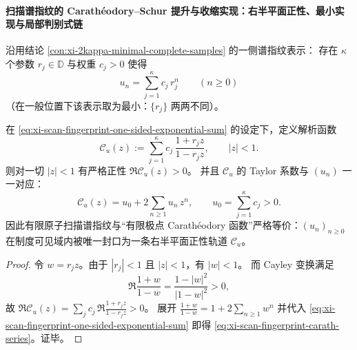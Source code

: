 \paragraph{扫描谱指纹的 Carath\'eodory--Schur 提升与收缩实现：右半平面正性、最小实现与局部判别式链}
沿用结论 \ref{con:xi-2kappa-minimal-complete-samples} 的一侧谱指纹表示：
存在 \(\kappa\) 个参数 \(r_j\in\mathbb{D}\) 与权重 \(c_j>0\) 使得
\begin{equation}\label{eq:xi-scan-fingerprint-one-sided-exponential-sum}
\boxed{\;
u_n=\sum_{j=1}^{\kappa}c_j\,r_j^n\qquad(n\ge 0)\;}
\end{equation}
（在一般位置下该表示取为最小：\(\{r_j\}\) 两两不同）。

\begin{proposition}\label{prop:xi-scan-fingerprint-caratheodory-lift}
在 \eqref{eq:xi-scan-fingerprint-one-sided-exponential-sum} 的设定下，定义解析函数
\begin{equation}\label{eq:xi-scan-fingerprint-carath}
\mathscr{C}_u(z):=\sum_{j=1}^{\kappa}c_j\,\frac{1+r_j z}{1-r_j z},
\qquad |z|<1.
\end{equation}
则对一切 \(|z|<1\) 有严格正性 \(\Re \mathscr{C}_u(z)>0\)。
并且 \(\mathscr{C}_u\) 的 Taylor 系数与 \((u_n)\) 一一对应：
\begin{equation}\label{eq:xi-scan-fingerprint-carath-series}
\boxed{\;
\mathscr{C}_u(z)
=u_0+2\sum_{n\ge 1}u_n\,z^n,\qquad u_0=\sum_{j=1}^{\kappa}c_j>0.\;}
\end{equation}
因此有限原子扫描谱指纹与“有限极点 Carath\'eodory 函数”严格等价：\((u_n)_{n\ge 0}\) 在制度可见域内被唯一封口为一条右半平面正性轨道 \(\mathscr{C}_u\)。
\end{proposition}
\begin{proof}
令 \(w=r_j z\)。由于 \(|r_j|<1\) 且 \(|z|<1\)，有 \(|w|<1\)。
而 Cayley 变换满足
\[
\Re\frac{1+w}{1-w}=\frac{1-|w|^2}{|1-w|^2}>0,
\]
故 \(\Re\mathscr{C}_u(z)=\sum_j c_j\,\Re\frac{1+r_j z}{1-r_j z}>0\)。
展开
\(
\frac{1+w}{1-w}=1+2\sum_{n\ge 1}w^n
\)
并代入 \eqref{eq:xi-scan-fingerprint-one-sided-exponential-sum} 即得 \eqref{eq:xi-scan-fingerprint-carath-series}。证毕。
\end{proof}

